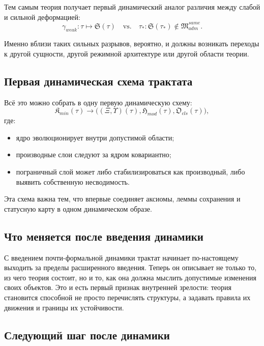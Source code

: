 \documentclass[12pt,a4paper]{article}
\begin{document}
Тем самым теория получает первый динамический аналог различия между слабой и сильной деформацией:
\begin{equation}
\gamma_{weak}: \tau\mapsto \mathfrak{S}(\tau)
\quad \text{vs.} \quad
\tau_*: \mathfrak{S}(\tau_*) \notin \mathfrak{M}_{adm}^{same}.
\end{equation}

Именно вблизи таких сильных разрывов, вероятно, и должны возникать переходы к другой сущности, другой режимной архитектуре или другой области теории.

\subsection{Первая динамическая схема трактата}

Всё это можно собрать в одну первую динамическую схему:
\begin{equation}
\mathfrak{K}_{min}(\tau)
\longrightarrow
\bigl((\Xi,\Upsilon)(\tau),\mathfrak{H}_{mod}(\tau),\mathfrak{O}_{cls}(\tau)\bigr),
\end{equation}
где:
\begin{itemize}
    \item ядро эволюционирует внутри допустимой области;
    \item производные слои следуют за ядром ковариантно;
    \item пограничный слой может либо стабилизироваться как производный, либо выявить собственную несводимость.
\end{itemize}

Эта схема важна тем, что впервые соединяет аксиомы, леммы сохранения и статусную карту в одном динамическом образе.

\subsection{Что меняется после введения динамики}

С введением почти-формальной динамики трактат начинает по-настоящему выходить за пределы расширенного введения. Теперь он описывает не только то, из чего теория состоит, но и то, как она должна мыслить допустимые изменения своих объектов. Это и есть первый признак внутренней зрелости: теория становится способной не просто перечислять структуры, а задавать правила их движения и границы их устойчивости.

\subsection{Следующий шаг после динамики}
\end{document}
